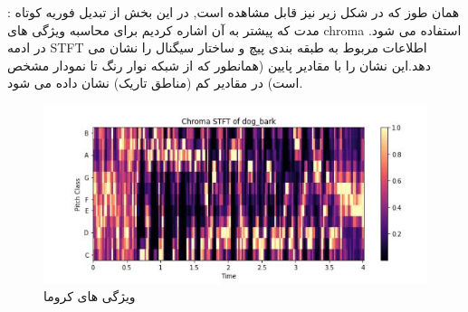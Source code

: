 \documentclass{article}
\begin{document}
: \newline
همان طوز که در شکل زیر نیز قابل مشاهده است, در این بخش از تبدیل فوریه کوتاه مدت که پیشتر به آن اشاره کردیم برای محاسبه ویژگی های chroma استفاده می شود.\newline
در ادمه  STFT اطلاعات مربوط به طبقه بندی پیچ و ساختار سیگنال را نشان می دهد.این نشان را با مقادیر پایین (همانطور که از شبکه نوار رنگ تا نمودار مشخص است) در مقادیر کم (مناطق تاریک) نشان داده می شود.
\begin{figure}[h]
	\centering
	\includegraphics[width=0.7\linewidth]{Photo/7}
	\caption[ویژگی های کروما]{ویژگی های کروما }
	\label{fig:7}
\end{figure}
\end{document}

